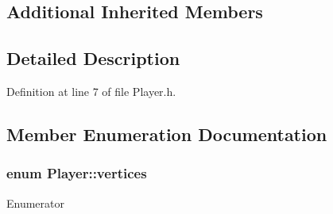 \subsection*{Additional Inherited Members}


\subsection{Detailed Description}


Definition at line 7 of file Player.\-h.



\subsection{Member Enumeration Documentation}
\hypertarget{classPlayer_a861f91cf755f14d4d7001edbc1c79980}{
\subsubsection[{vertices}]{\setlength{\rightskip}{0pt plus 5cm}enum {\bf Player\-::vertices}}}\label{classPlayer_a861f91cf755f14d4d7001edbc1c79980}
\begin{Desc}
\item[Enumerator]\par
\begin{description}
\item[{\em 
\hypertarget{classPlayer_a861f91cf755f14d4d7001edbc1c79980aa7d37123327782f87ebdfc1603947128}{F0}\label{classPlayer_a861f91cf755f14d4d7001edbc1c79980aa7d37123327782f87ebdfc1603947128}
}]\item[{\em 
\hypertarget{classPlayer_a861f91cf755f14d4d7001edbc1c79980a1fc1b1ec99eda01d44d9db82506f8d38}{F1}\label{classPlayer_a861f91cf755f14d4d7001edbc1c79980a1fc1b1ec99eda01d44d9db82506f8d38}
}]\item[{\em 
\hypertarget{classPlayer_a861f91cf755f14d4d7001edbc1c79980a4cf8b3b1f9c2d77553f516a958f74298}{F2}\label{classPlayer_a861f91cf755f14d4d7001edbc1c79980a4cf8b3b1f9c2d77553f516a958f74298}
}]\item[{\em 
\hypertarget{classPlayer_a861f91cf755f14d4d7001edbc1c79980a369182dcb6e960c07f8d437ef59364df}{F3}\label{classPlayer_a861f91cf755f14d4d7001edbc1c79980a369182dcb6e960c07f8d437ef59364df}
}]\end{description}
\end{Desc}


